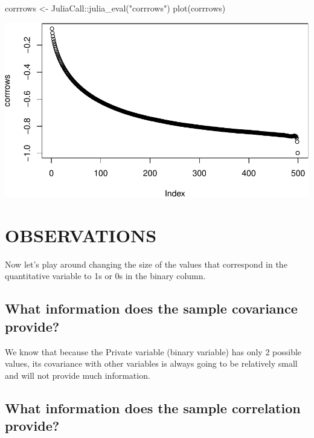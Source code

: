 \documentclass[
]{article}
\newenvironment{Shaded}{\begin{snugshade}}{\end{snugshade}}
\newcommand{\FunctionTok}[1]{\textcolor[rgb]{0.00,0.00,0.00}{#1}}
\newcommand{\NormalTok}[1]{#1}
\newcommand{\OtherTok}[1]{\textcolor[rgb]{0.56,0.35,0.01}{#1}}
\newcommand{\SpecialCharTok}[1]{\textcolor[rgb]{0.00,0.00,0.00}{#1}}
\newcommand{\StringTok}[1]{\textcolor[rgb]{0.31,0.60,0.02}{#1}}
\begin{document}
\begin{Shaded}
\begin{Highlighting}[]
\NormalTok{corrrows }\OtherTok{\textless{}{-}}\NormalTok{ JuliaCall}\SpecialCharTok{::}\FunctionTok{julia\_eval}\NormalTok{(}\StringTok{"corrrows"}\NormalTok{)}
\FunctionTok{plot}\NormalTok{(corrrows)}
\end{Highlighting}
\end{Shaded}

\includegraphics{./figures/unnamed-chunk-10-2.pdf}

\hypertarget{observations}{%
\section{OBSERVATIONS}\label{observations}}

Now let's play around changing the size of the values that correspond in
the quantitative variable to 1s or 0s in the binary column.

\hypertarget{what-information-does-the-sample-covariance-provide}{%
\subsection{What information does the sample covariance
provide?}\label{what-information-does-the-sample-covariance-provide}}

We know that because the Private variable (binary variable) has only 2
possible values, its covariance with other variables is always going to
be relatively small and will not provide much information.

\newpage

\hypertarget{what-information-does-the-sample-correlation-provide}{%
\subsection{What information does the sample correlation
provide?}\label{what-information-does-the-sample-correlation-provide}}
\end{document}
